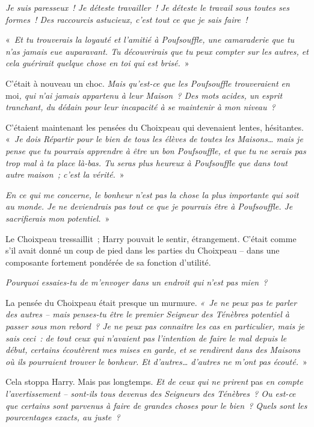 \emph{Je suis paresseux~! Je déteste travailler~! Je déteste le travail sous toutes ses formes~! Des raccourcis astucieux, c'est tout ce que je sais faire~!}

«~\emph{Et tu trouverais la loyauté et l'amitié à Poufsouffle, une camaraderie que tu n'as jamais eue auparavant.
Tu découvrirais que tu peux compter sur les autres, et cela guérirait quelque chose en toi qui est brisé.}~»

C'était à nouveau un choc.
\emph{Mais qu'est-ce que les Poufsouffle trouveraient en} moi\emph{, qui n'ai jamais appartenu à leur Maison~?
Des mots acides, un esprit tranchant, du dédain pour leur incapacité à se maintenir à mon niveau~?}

C'étaient maintenant les pensées du Choixpeau qui devenaient lentes, hésitantes.
«~\emph{Je dois Répartir pour le bien de tous les élèves de toutes les Maisons… mais je pense que tu pourrais apprendre à être un bon Poufsouffle, et que tu ne serais pas trop mal à ta place là-bas.
Tu seras plus heureux à Poufsouffle que dans tout autre maison~; c'est la vérité.}~»

\emph{En ce qui me concerne, le bonheur n'est pas la chose la plus importante qui soit au monde.
Je ne deviendrais pas tout ce que je pourrais être à Poufsouffle.
Je sacrifierais mon potentiel.}~»

Le Choixpeau tressaillit~; Harry pouvait le sentir, étrangement.
C'était comme s'il avait donné un coup de pied dans les parties du Choixpeau -- dans une composante fortement pondérée de sa fonction d'utilité.

\emph{Pourquoi essaies-tu de m'envoyer dans un endroit qui n'est pas mien~?}

La pensée du Choixpeau était presque un murmure.
\emph{«~Je ne peux pas te parler des autres -- mais penses-tu être le premier Seigneur des Ténèbres potentiel à passer sous mon rebord~?
Je ne peux pas connaitre les cas en particulier, mais je sais ceci~:
de tout ceux qui n'avaient pas l'intention de faire le mal depuis le début, certains écoutèrent mes mises en garde, et se rendirent dans des Maisons où ils pourraient trouver le bonheur.
Et d'autres… d'autres ne m'ont pas écouté.}~»

Cela stoppa Harry. Mais pas longtemps.
\emph{Et de ceux qui ne prirent} pas \emph{en compte l'avertissement -- sont-ils tous devenus des Seigneurs des Ténèbres~?
Ou est-ce que certains sont parvenus à faire de grandes choses pour le bien~?
Quels sont les pourcentages exacts, au juste~?}

